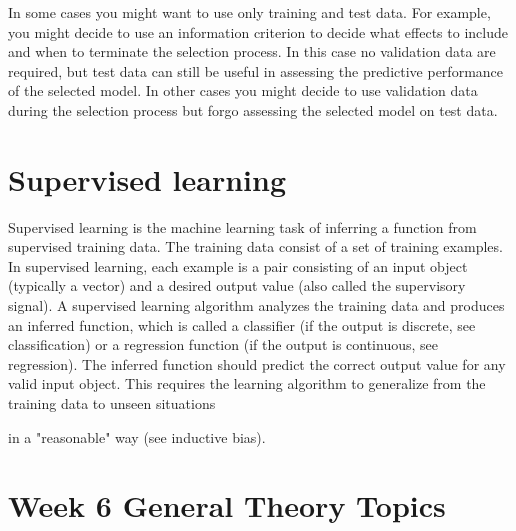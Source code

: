 \documentclass[]{report}
\begin{document}
In some cases you might want to use only training and test data. For example, you might decide to use an information criterion to decide what effects to include and when to terminate the selection process. In this case no validation data are required, but test data can still be useful in assessing the predictive performance of the selected model. In other cases you might decide to use validation data during the selection process but forgo assessing the selected model on test data. 



\section{Supervised learning}


Supervised learning is the machine learning task of inferring a function from supervised training data. The training data consist of a set of training examples. In supervised learning, each example is a pair consisting of an input object (typically a vector) and a desired output value (also called the supervisory signal). A supervised learning algorithm analyzes the training data and produces an inferred function, which is called a classifier (if the output is discrete, see classification) or a regression function (if the output is continuous, see regression). The inferred function should predict the correct output value for any valid input object. This requires the learning algorithm to generalize from the training data to unseen situations 

in a "reasonable" way (see inductive bias). 





\newpage
\section{Week 6 General Theory Topics}
\end{document}
